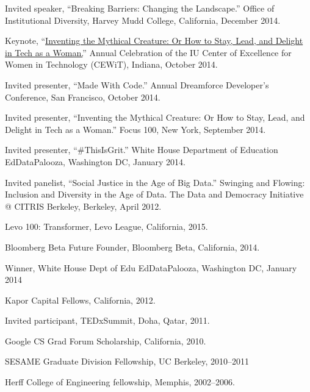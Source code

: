 \documentclass[11pt,article,oneside]{memoir}
\begin{document}
\ind Invited speaker, ``Breaking Barriers: Changing the Landscape.'' Office of Institutional Diversity, Harvey Mudd College, California, December 2014. 

\ind Keynote, ``\href{https://www.youtube.com/watch?v=owXez6sIRbY&ab_channel=IUCEWIT}{Inventing the Mythical Creature: Or How to Stay, Lead, and Delight in Tech as a Woman.}'' Annual Celebration of the IU Center of Excellence for Women in Technology (CEWiT), Indiana, October 2014.

\ind Invited presenter, ``Made With Code.'' Annual Dreamforce Developer's Conference, San Francisco, October 2014.

\ind Invited presenter, ``Inventing the Mythical Creature: Or How to Stay, Lead, and Delight in Tech as a Woman.'' Focus 100, New York, September 2014.

\ind Invited presenter, ``\#ThisIsGrit.'' White House Department of Education EdDataPalooza, Washington DC, January 2014.

\ind Invited panelist, ``Social Justice in the Age of Big Data.'' Swinging and Flowing: Inclusion and Diversity in the Age of Data. The Data and Democracy Initiative @ CITRIS Berkeley, Berkeley, April 2012.

\bigskip 

\medskip

\ind Levo 100: Transformer, Levo League, California, 2015.

\ind Bloomberg Beta Future Founder, Bloomberg Beta, California, 2014. 

\ind Winner, White House Dept of Edu EdDataPalooza, Washington DC, January 2014

\ind Kapor Capital Fellows, California, 2012.

\ind Invited participant, TEDxSummit, Doha, Qatar, 2011.

\ind Google CS Grad Forum Scholarship, California, 2010.

\ind SESAME Graduate Division Fellowship, UC Berkeley, 2010--2011

\ind Herff College of Engineering fellowship, Memphis, 2002--2006.

\bigskip 

\medskip
\end{document}
